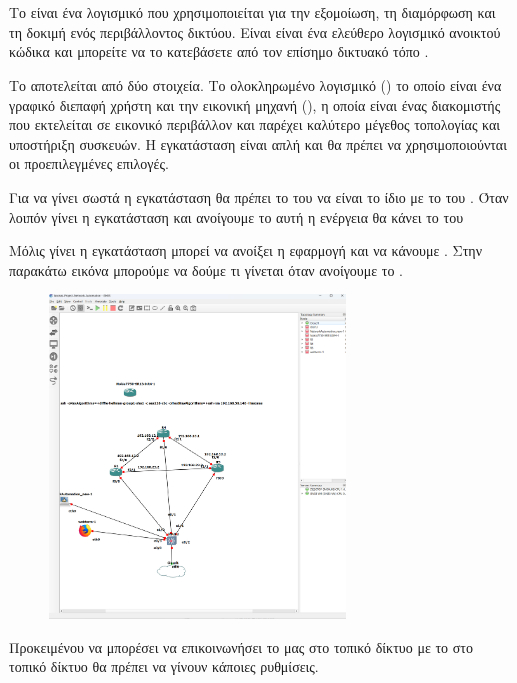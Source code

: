 \chapter{}

\section{}

Το  είναι ένα λογισμικό που χρησιμοποιείται για την εξομοίωση, τη διαμόρφωση και τη δοκιμή ενός περιβάλλοντος δικτύου. Είναι
είναι ένα ελεύθερο λογισμικό ανοικτού κώδικα και μπορείτε να το κατεβάσετε από τον επίσημο δικτυακό τόπο 
 .

Το  αποτελείται από δύο στοιχεία. Το ολοκληρωμένο λογισμικό () το οποίο είναι ένα γραφικό 
διεπαφή χρήστη και την εικονική μηχανή (), η οποία είναι ένας διακομιστής που εκτελείται σε εικονικό περιβάλλον και παρέχει καλύτερο μέγεθος τοπολογίας και υποστήριξη συσκευών.
Η εγκατάσταση είναι απλή και θα πρέπει να χρησιμοποιούνται οι προεπιλεγμένες επιλογές.

Για να γίνει σωστά η εγκατάσταση θα πρέπει το  του  να είναι το ίδιο με το
 του . Όταν λοιπόν γίνει η εγκατάσταση και ανοίγουμε το 
αυτή η ενέργεια θα κάνει  το  του 

Μόλις γίνει η εγκατάσταση μπορεί να ανοίξει η εφαρμογή και να κάνουμε . Στην παρακάτω
εικόνα μπορούμε να δούμε τι γίνεται όταν ανοίγουμε το . 

\begin{figure}[htb]
	\centering
	\includegraphics[width=0.7\textwidth]{graphics/gns3_homepage.png}
	\caption{ }
\end{figure}

Προκειμένου να μπορέσει να επικοινωνήσει το  μας στο τοπικό δίκτυο με το  στο τοπικό δίκτυο
θα πρέπει να γίνουν κάποιες ρυθμίσεις.